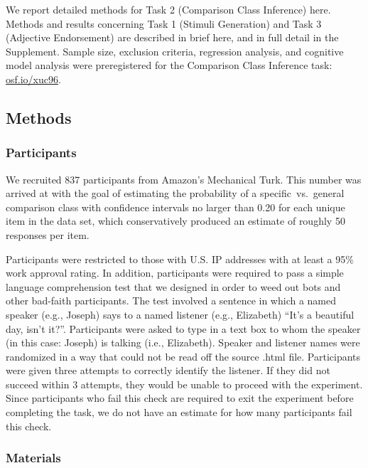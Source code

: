 \documentclass[doc]{apa6}
\begin{document}

We report detailed methods for Task 2 (Comparison Class Inference) here. 
Methods and results concerning Task 1 (Stimuli Generation) and Task 3 (Adjective Endorsement) are described in brief here, and in full detail in the Supplement.
Sample size, exclusion criteria, regression analysis, and cognitive model analysis were preregistered for the Comparison Class Inference task: \url{osf.io/xuc96}.


\subsection{Methods}

\subsubsection{Participants}

We recruited 837 participants from Amazon's Mechanical Turk. 
This number was arrived at with the goal of estimating the probability of a specific~vs.~general comparison class with confidence intervals no larger than 0.20 for each unique item in the data set, which conservatively produced an estimate of roughly 50 responses per item.

Participants were restricted to those with U.S. IP addresses with at least a 95\% work approval rating. 
In addition, participants were required to pass a simple language comprehension test that we designed in order to weed out bots and other bad-faith participants. 
The test involved a sentence in which a named speaker (e.g., Joseph) says to a named listener (e.g., Elizabeth) ``It's a beautiful day, isn't it?''. 
Participants were asked to type in a text box to whom the speaker (in this case: Joseph) is talking (i.e., Elizabeth).
Speaker and listener names were randomized in a way that could not be read off the source .html file.
Participants were given three attempts to correctly identify the listener. 
If they did not succeed within 3 attempts, they would be unable to proceed with the experiment.
Since participants who fail this check are required to exit the experiment before completing the task, we do not have an estimate for how many participants fail this check. 

\subsubsection{Materials}
\end{document}
